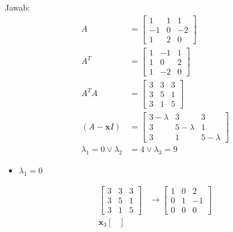 \documentclass[12pt, a4paper]{scrartcl}
\begin{document}
\begin{enumerate}
\begin{enumerate}
                Jawab:
                \begin{align*}
                    A&=\begin{bmatrix}
                        1 & 1 & 1\\
                        -1 & 0 & -2\\
                        1 & 2 & 0
                    \end{bmatrix}
                    \\A^T&=\begin{bmatrix}
                        1 & -1 & 1\\
                        1 & 0 & 2\\
                        1 & -2 & 0
                    \end{bmatrix}
                    \\A^TA&=\begin{bmatrix}
                        3&3&3\\3&5&1\\3&1&5
                    \end{bmatrix}
                    \\ (A-\textbf{x}I) &= \begin{bmatrix}
                        3-\lambda&3&3\\3&5-\lambda&1\\3&1&5-\lambda
                    \end{bmatrix}
                    \\ \lambda_1=0\lor \lambda_2 &= 4 \lor \lambda_3=9
                \end{align*}
                \begin{itemize}
                    \item[] $\lambda_1=0$
                \end{itemize}
                \begin{align*}
                    \begin{bmatrix}
                        3&3&3\\3&5&1\\3&1&5
                    \end{bmatrix} &\to \begin{bmatrix}
                        1&0&2\\0&1&-1\\0&0&0
                    \end{bmatrix}
                    \\ \textbf{x}_3\begin{bmatrix}

\end{bmatrix}
\end{align*}
\end{enumerate}
\end{enumerate}
\end{document}
